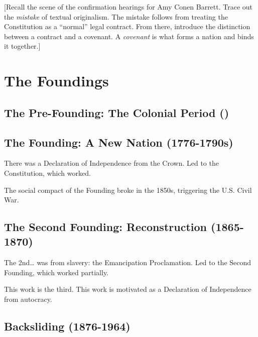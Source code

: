 \documentclass[
]{book}
\begin{document}
{[}Recall the scene of the confirmation hearings for Amy Conen Barrett. Trace out the \emph{mistake} of textual originalism. The mistake follows from treating the Constitution as a ``normal'' legal contract. From there, introduce the distinction between a contract and a covenant. A \emph{covenant} is what forms a nation and binds it together.{]}

\hypertarget{the-foundings}{%
\section{The Foundings}\label{the-foundings}}

\hypertarget{the-pre-founding-the-colonial-period}{%
\subsection{The Pre-Founding: The Colonial Period ()}\label{the-pre-founding-the-colonial-period}}

\hypertarget{the-founding-a-new-nation-1776-1790s}{%
\subsection{The Founding: A New Nation (1776-1790s)}\label{the-founding-a-new-nation-1776-1790s}}

There was a Declaration of Independence from the Crown. Led to the Constitution, which worked.

The social compact of the Founding broke in the 1850s, triggering the U.S. Civil War.

\hypertarget{the-second-founding-reconstruction-1865-1870}{%
\subsection{The Second Founding: Reconstruction (1865-1870)}\label{the-second-founding-reconstruction-1865-1870}}

The 2nd\ldots{} was from slavery: the Emancipation Proclamation. Led to the Second Founding, which worked partially.

This work is the third. This work is motivated as a Declaration of Independence from autocracy.

\hypertarget{backsliding-1876-1964}{%
\subsection{Backsliding (1876-1964)}\label{backsliding-1876-1964}}
\end{document}

